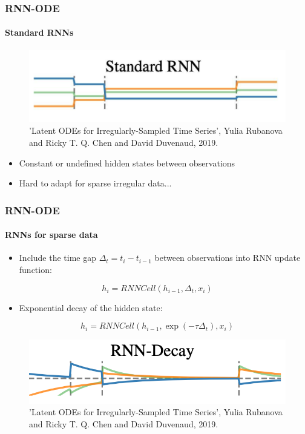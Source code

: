 \documentclass{beamer}
\begin{document}
{%
\begin{frame}
	\frametitle{RNN-ODE}
	\framesubtitle{Standard RNNs}
	\begin{figure}
	\includegraphics[height=0.24\linewidth]{standard_RNN.png}
	\caption*{'Latent ODEs for Irregularly-Sampled Time Series', Yulia Rubanova and Ricky T. Q. Chen and David Duvenaud, 2019.}
	\end{figure}
	\break
	\pause \begin{itemize}
	\item{Constant or undefined hidden states between observations}
	\end{itemize}
	\begin{itemize}
	\item{Hard to adapt for sparse irregular data...}
	\end{itemize}
\end{frame}
\begin{frame}
	\frametitle{RNN-ODE}
	\framesubtitle{RNNs for sparse data}
	\begin{itemize}
	\item{Include the time gap $\Delta_{t}=t_{i}-t_{i-1}$ between observations into RNN update function:}
	\end{itemize}
	$$h_{i} = RNNCell(h_{i-1}, \Delta_{t}, x_{i})$$
	\begin{itemize}
	\pause \item{Exponential decay of the hidden state:}
	\end{itemize}
	$$h_{i} = RNNCell(h_{i-1}, \exp{(-\tau \Delta_{t})}, x_{i})$$
	\begin{figure}
	\includegraphics[height=0.18\linewidth]{RNN_decay.png}
	\caption*{'Latent ODEs for Irregularly-Sampled Time Series', Yulia Rubanova and Ricky T. Q. Chen and David Duvenaud, 2019.}
	\end{figure}
\end{frame}
}
\end{document}

